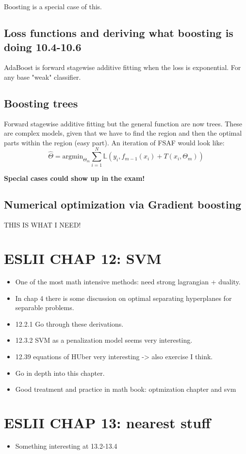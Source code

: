 \documentclass{article}
\begin{document}
Boosting is a special case of this.

\subsection*{Loss functions and deriving what boosting is doing 10.4-10.6}

AdaBoost is forward stagewise additive fitting when the loss is exponential. For any base "weak" classifier.

\subsection*{Boosting trees}
Forward stagewise additive fitting but the general function are now trees. These are complex models, given that we have to find the region and
then the optimal parts within the region (easy part).
An iteration of FSAF would look like: $$\hat{\Theta} = \text{argmin}_{\Theta_m} \sum_{i=1}^{N}\mathbb{L} (y_i,f_{m-1}(x_i) + T(x_i, \Theta_m))$$


\textbf{Special cases could show up in the exam!}

\subsection*{Numerical optimization via Gradient boosting}
THIS IS WHAT I NEED!

\section*{ESLII CHAP 12: SVM}
\begin{itemize}
    \item One of the most math intensive methods: need strong lagrangian + duality.
    \item In chap 4 there is some discussion on optimal separating hyperplanes for separable problems.
    \item 12.2.1 Go through these derivations.
    \item 12.3.2 SVM as a penalization model seems very interesting.
    \item 12.39 equations of HUber very interesting -> also exercise I think.
    \item Go in depth into this chapter.
    \item Good treatment and practice in math book: optmization chapter and svm
\end{itemize}

\section*{ESLII CHAP 13: nearest stuff}
\begin{itemize}
    \item Something interesting at 13.2-13.4
\end{itemize}
\end{document}
